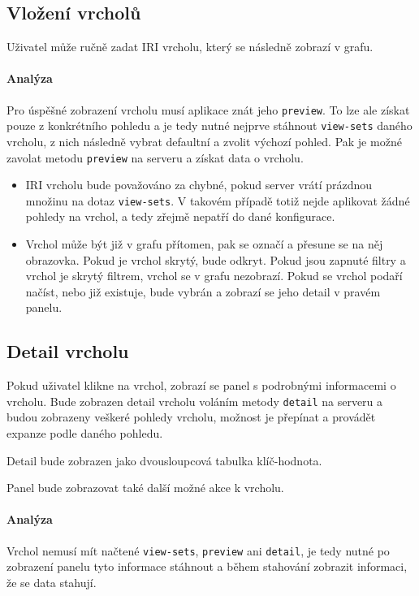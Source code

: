 \subsection*{Vložení vrcholů}
Uživatel může ručně zadat IRI vrcholu, který se následně zobrazí v grafu.

\paragraph{Analýza} Pro úspěšné zobrazení vrcholu musí aplikace znát jeho \texttt{preview}. To lze ale získat pouze z konkrétního pohledu a je tedy nutné nejprve stáhnout \texttt{view-sets} daného vrcholu, z nich následně vybrat defaultní a zvolit výchozí pohled. Pak je možné zavolat metodu \texttt{preview} na serveru a získat data o vrcholu.

\begin{itemize}
    \item IRI vrcholu bude považováno za chybné, pokud server vrátí prázdnou množinu na dotaz \texttt{view-sets}. V takovém případě totiž nejde aplikovat žádné pohledy na vrchol, a tedy zřejmě nepatří do dané konfigurace.
    \item Vrchol může být již v grafu přítomen, pak se označí a přesune se na něj obrazovka. Pokud je vrchol skrytý, bude odkryt. Pokud jsou zapnuté filtry a vrchol je skrytý filtrem, vrchol se v grafu nezobrazí. Pokud se vrchol podaří načíst, nebo již existuje, bude vybrán a zobrazí se jeho detail v pravém panelu.
\end{itemize}

\subsection*{Detail vrcholu}
Pokud uživatel klikne na vrchol, zobrazí se panel s podrobnými informacemi o vrcholu. Bude zobrazen detail vrcholu voláním metody \texttt{detail} na serveru a budou zobrazeny veškeré pohledy vrcholu, možnost je přepínat a provádět expanze podle daného pohledu.

Detail bude zobrazen jako dvousloupcová tabulka klíč-hodnota.

Panel bude zobrazovat také další možné akce k vrcholu.

\paragraph{Analýza} Vrchol nemusí mít načtené \texttt{view-sets}, \texttt{preview} ani \texttt{detail}, je tedy nutné po zobrazení panelu tyto informace stáhnout a během stahování zobrazit informaci, že se data stahují.

